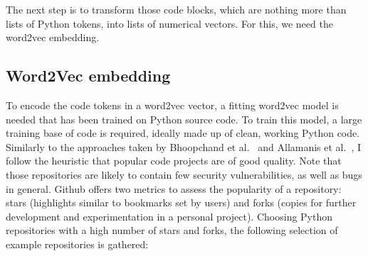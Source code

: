 \documentclass[
a4paper,
pagesize,
pdftex,
12pt,
twoside, %
BCOR=5mm, %
ngerman,
fleqn,
final,
]{scrartcl}
\begin{document}
	The next step is to transform those code blocks, which are nothing more than lists of Python tokens, into lists of numerical vectors. For this, we need the word2vec embedding. 
	
	\subsection{Word2Vec embedding}
	To encode the code tokens in a word2vec vector, a fitting word2vec model is needed that has been trained on Python source code. To train this model, a large training base of code is required, ideally made up of clean, working Python code.\\
	Similarly to the approaches taken by Bhoopchand et al.~\cite{Bhoopchand.2016} and Allamanis et al.~\cite{Allamanis.2013}, I follow the heuristic that popular code projects are of good quality. Note that those repositories are likely to contain few security vulnerabilities, as well as bugs in general. Github offers two metrics to assess the popularity of a repository: stars (highlights similar to bookmarks set by users) and forks (copies for further development and experimentation in a personal project). Choosing Python repositories with a high number of stars and forks, the following selection of example repositories is gathered:
	
\end{document}
